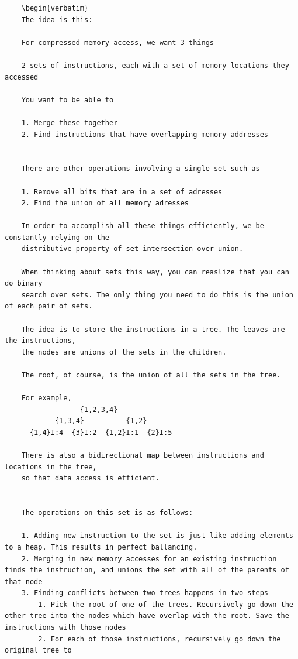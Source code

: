 \documentclass[12pt,twoside]{reedthesis}
\begin{document}
		\begin{verbatim}
    \begin{verbatim}
    The idea is this:

    For compressed memory access, we want 3 things

    2 sets of instructions, each with a set of memory locations they accessed

    You want to be able to

    1. Merge these together
    2. Find instructions that have overlapping memory addresses


    There are other operations involving a single set such as

    1. Remove all bits that are in a set of adresses
    2. Find the union of all memory adresses

    In order to accomplish all these things efficiently, we be constantly relying on the
    distributive property of set intersection over union.

    When thinking about sets this way, you can reaslize that you can do binary
    search over sets. The only thing you need to do this is the union of each pair of sets.

    The idea is to store the instructions in a tree. The leaves are the instructions,
    the nodes are unions of the sets in the children.

    The root, of course, is the union of all the sets in the tree.

    For example,
                  {1,2,3,4}
            {1,3,4}          {1,2}
      {1,4}I:4  {3}I:2  {1,2}I:1  {2}I:5

    There is also a bidirectional map between instructions and locations in the tree,
    so that data access is efficient.


    The operations on this set is as follows:

    1. Adding new instruction to the set is just like adding elements to a heap. This results in perfect ballancing.
    2. Merging in new memory accesses for an existing instruction finds the instruction, and unions the set with all of the parents of that node
    3. Finding conflicts between two trees happens in two steps
        1. Pick the root of one of the trees. Recursively go down the other tree into the nodes which have overlap with the root. Save the instructions with those nodes
        2. For each of those instructions, recursively go down the original tree to
    \end{verbatim}
	
\end{document}
